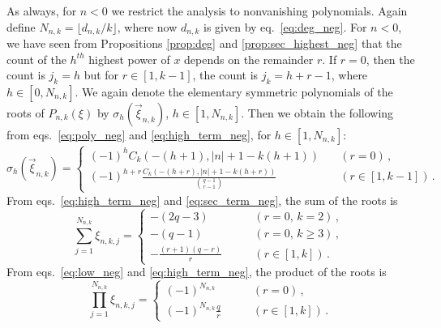 \documentclass[review]{elsarticle}
\theoremstyle{plain}
\begin{document}
As always, for $n<0$ we restrict the analysis to nonvanishing polynomials.
Again define $N_{n,k} = \lfloor d_{n,k}/k\rfloor$, where now $d_{n,k}$ is given by eq.~\eqref{eq:deg_neg}.
For $n<0$, we have seen from Propositions \ref{prop:deg} and \ref{prop:sec_highest_neg}
that the count of the $h^{th}$ highest power of $x$ depends on the remainder $r$.
If $r=0$, then the count is $j_k=h$ but for $r\in[1,k-1]$, the count is $j_k=h+r-1$, where $h\in[0,N_{n,k}]$.
We again denote the elementary symmetric polynomials of the roots of $P_{n,k}(\xi)$ by $\sigma_h(\vec{\xi}_{n,k})$, $h\in[1,N_{n,k}]$.
Then we obtain the following from eqs.~\eqref{eq:poly_neg} and \eqref{eq:high_term_neg}, for $h\in[1,N_{n,k}]$:
\begin{equation}
\sigma_h(\vec{\xi}_{n,k}) = \begin{cases} \displaystyle (-1)^h C_k(-(h+1),|n|+1-k(h+1)) &\quad (r=0) \,,\phantom{\Biggl|} \\
  \displaystyle (-1)^{h+r} \frac{C_k(-(h+r),|n|+1-k(h+r))}{\displaystyle\binom{q-1}{r-1}} &\quad (r\in[1,k-1]) \,.
  \end{cases}
\end{equation}
From eqs.~\eqref{eq:high_term_neg} and \eqref{eq:sec_term_neg}, the sum of the roots is
\begin{equation}
\sum_{j=1}^{N_{n,k}} \xi_{n,k,j} = \begin{cases} 
  -(2q-3) & \qquad (r=0,\, k=2)\,,\\ %
  -(q-1) & \qquad (r=0,\, k\ge3)\,,\phantom{\biggl|} \\
  \displaystyle -\frac{(r+1)(q-r)}{r} &\qquad (r\in[1,k])  \,.
\end{cases}
\end{equation}
From eqs.~\eqref{eq:low_neg} and \eqref{eq:high_term_neg}, the product of the roots is 
\begin{equation}
\label{eq:prod_neg}  
\prod_{j=1}^{N_{n,k}} \xi_{n,k,j} 
  = \begin{cases} (-1)^{N_{n,k}}  &\qquad (r=0) \,,\phantom{\biggl|} \\
    \displaystyle (-1)^{N_{n,k}}\frac{q}{r} &\qquad (r\in[1,k]) \,.
\end{cases}
\end{equation}

\end{document}
